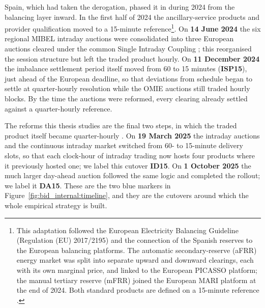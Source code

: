 \documentclass[11pt,a4paper]{article}
\theoremstyle{definition}
\theoremstyle{remark}
\theoremstyle{plain}
\begin{document}
Spain, which had taken the derogation, phased it in during 2024 from the balancing layer inward. In the first half of 2024 the ancillary-service products and provider qualification moved to a 15-minute reference\footnote{This adaptation followed the European Electricity Balancing Guideline (Regulation (EU) 2017/2195) and the connection of the Spanish reserves to the European balancing platforms. The automatic secondary-reserve (aFRR) energy market was split into separate upward and downward clearings, each with its own marginal price, and linked to the European PICASSO platform; the manual tertiary reserve (mFRR) joined the European MARI platform at the end of 2024. Both standard products are defined on a 15-minute reference \citep{boe_a_2024_11535}.}. On \textbf{14 June 2024} the six regional MIBEL intraday auctions were consolidated into three European auctions cleared under the common Single Intraday Coupling \citep{cnmc_sidc_ida_2024}; this reorganised the session structure but left the traded product hourly. On \textbf{11 December 2024} the imbalance settlement period itself moved from 60 to 15 minutes (\textbf{ISP15}), just ahead of the European deadline, so that deviations from schedule began to settle at quarter-hourly resolution while the OMIE auctions still traded hourly blocks. By the time the auctions were reformed, every clearing already settled against a quarter-hourly reference.

The reforms this thesis studies are the final two steps, in which the traded product itself became quarter-hourly \citep{boe_a_2025_4908}. On \textbf{19 March 2025} the intraday auctions and the continuous intraday market switched from 60- to 15-minute delivery slots, so that each clock-hour of intraday trading now hosts four products where it previously hosted one; we label this cutover \textbf{ID15}. On \textbf{1 October 2025} the much larger day-ahead auction followed the same logic and completed the rollout; we label it \textbf{DA15}. These are the two blue markers in Figure~\ref{fig:bid_internal:timeline}, and they are the cutovers around which the whole empirical strategy is built.
\end{document}
